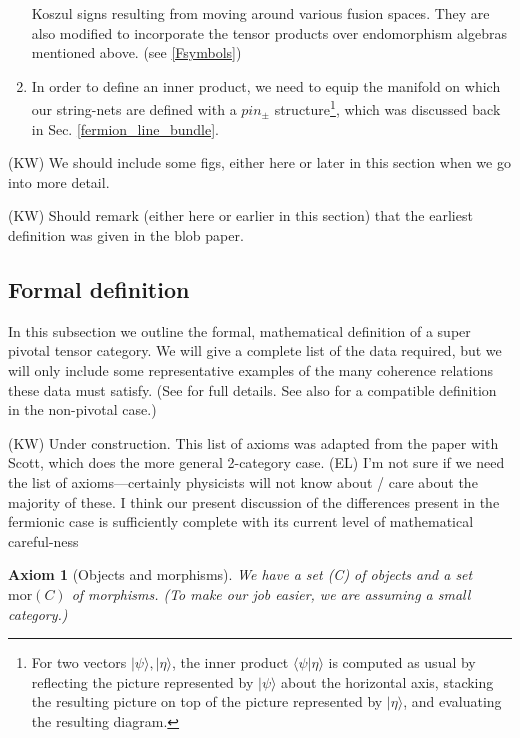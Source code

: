 \documentclass[12pt,a4paper]{article}
\newtheorem{axiom}[theorem]{Axiom}
\newcommand{\mor}{\text{mor}}
\newcommand{\obj}{\text{obj}}
\newcommand{\kw}[1]{{\color{kwcolor}\footnotesize{(KW) #1}}}
\newcommand{\ethan}[1]{{\color{amethyst}\footnotesize{(EL) #1}}}
\begin{document}
\begin{enumerate}
	 Koszul signs resulting from moving around various fusion spaces. 
	 They are also modified to incorporate the tensor products over endomorphism algebras mentioned above. (see \ref{Fsymbols})
	\item In order to define an inner product, we need to equip the manifold on which our string-nets are defined with a $pin_\pm$ structure\footnote{For two vectors $|\psi\rangle,|\eta\rangle$, the inner product $\langle \psi | \eta \rangle$ is computed as usual by reflecting the picture represented by $|\psi\rangle$ about the horizontal axis, stacking the resulting picture on top of the picture represented by $|\eta\rangle$, and evaluating the resulting diagram.}, which was discussed back in Sec. \ref{fermion_line_bundle}.
\end{enumerate}

\kw{We should include some figs, either here or later in this section when we go into more detail.}

\kw{Should remark (either here or earlier in this section) that the earliest definition was given in the blob paper.}



\subsection{Formal definition}

In this subsection we outline the formal, mathematical definition of a super pivotal tensor category.
We will give a complete list of the data required, but we will only include some representative
examples of the many coherence relations these data must satisfy.
(See \cite{MW-in-prep} for full details.  See also \cite{xxxx} for a compatible definition in the non-pivotal case.)



\kw{Under construction.
This list of axioms was adapted from the paper with Scott, which does the more general
2-category case.}
\ethan{I'm not sure if we need the list of axioms---certainly physicists will not know about / care about the majority of these. I think our present discussion of the differences present in the fermionic case is sufficiently complete with its current level of mathematical careful-ness}

\begin{axiom}[Objects and morphisms]
We have a set \obj(C) of objects and a set $\mor(C)$ of morphisms.
(To make our job easier, we are assuming a small category.)
\end{axiom}
\end{document}

